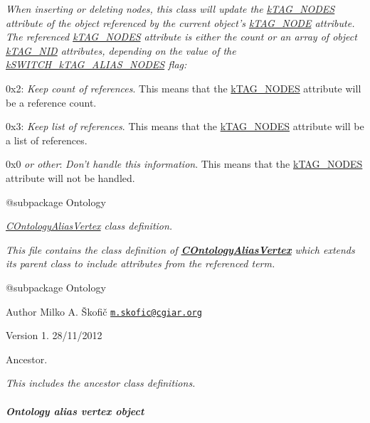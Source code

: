 {\itshape When inserting or deleting nodes, this class will update the \hyperlink{}{k\-T\-A\-G\-\_\-\-N\-O\-D\-E\-S} attribute of the object referenced by the current object's \hyperlink{}{k\-T\-A\-G\-\_\-\-N\-O\-D\-E} attribute. The referenced \hyperlink{}{k\-T\-A\-G\-\_\-\-N\-O\-D\-E\-S} attribute is either the count or an array of object \hyperlink{}{k\-T\-A\-G\-\_\-\-N\-I\-D} attributes, depending on the value of the \hyperlink{}{k\-S\-W\-I\-T\-C\-H\-\_\-k\-T\-A\-G\-\_\-\-A\-L\-I\-A\-S\-\_\-\-N\-O\-D\-E\-S} flag\-:}

{\itshape 
\begin{DoxyItemize}
\item {\ttfamily 0x2}\-: {\itshape Keep count of references}. This means that the \hyperlink{}{k\-T\-A\-G\-\_\-\-N\-O\-D\-E\-S} attribute will be a reference count. 
\item {\ttfamily 0x3}\-: {\itshape Keep list of references}. This means that the \hyperlink{}{k\-T\-A\-G\-\_\-\-N\-O\-D\-E\-S} attribute will be a list of references. 
\item {\ttfamily 0x0} {\itshape or other}\-: {\itshape Don't handle this information}. This means that the \hyperlink{}{k\-T\-A\-G\-\_\-\-N\-O\-D\-E\-S} attribute will not be handled. 
\end{DoxyItemize}}

{\itshape \begin{DoxyVerb} @subpackage        Ontology\end{DoxyVerb}
}

{\itshape {\itshape \hyperlink{class_c_ontology_alias_vertex}{C\-Ontology\-Alias\-Vertex}} class definition.}

{\itshape This file contains the class definition of {\bfseries \hyperlink{class_c_ontology_alias_vertex}{C\-Ontology\-Alias\-Vertex}} which extends its parent class to include attributes from the referenced term.}

{\itshape \begin{DoxyVerb} @subpackage        Ontology
\end{DoxyVerb}
}

{\itshape \begin{DoxyAuthor}{Author}
Milko A. Škofič \href{mailto:m.skofic@cgiar.org}{\tt m.\-skofic@cgiar.\-org} 
\end{DoxyAuthor}
\begin{DoxyVersion}{Version}
1. 28/11/2012
\end{DoxyVersion}
Ancestor.}

{\itshape This includes the ancestor class definitions. \subparagraph*{Ontology alias vertex object}}


